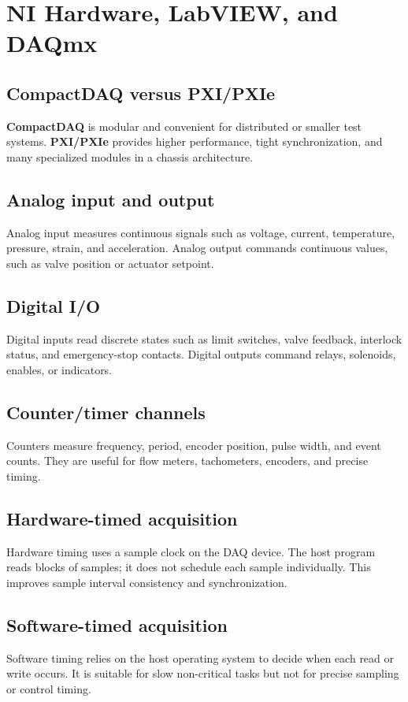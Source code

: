 \documentclass[11pt]{article}
\begin{document}
\section{NI Hardware, LabVIEW, and DAQmx}

\subsection{CompactDAQ versus PXI/PXIe}
\textbf{CompactDAQ} is modular and convenient for distributed or smaller test
systems. \textbf{PXI/PXIe} provides higher performance, tight synchronization,
and many specialized modules in a chassis architecture.

\subsection{Analog input and output}
Analog input measures continuous signals such as voltage, current, temperature,
pressure, strain, and acceleration. Analog output commands continuous values,
such as valve position or actuator setpoint.

\subsection{Digital I/O}
Digital inputs read discrete states such as limit switches, valve feedback,
interlock status, and emergency-stop contacts. Digital outputs command relays,
solenoids, enables, or indicators.

\subsection{Counter/timer channels}
Counters measure frequency, period, encoder position, pulse width, and event
counts. They are useful for flow meters, tachometers, encoders, and precise
timing.

\subsection{Hardware-timed acquisition}
Hardware timing uses a sample clock on the DAQ device. The host program reads
blocks of samples; it does not schedule each sample individually. This improves
sample interval consistency and synchronization.

\subsection{Software-timed acquisition}
Software timing relies on the host operating system to decide when each read or
write occurs. It is suitable for slow non-critical tasks but not for precise
sampling or control timing.
\end{document}
